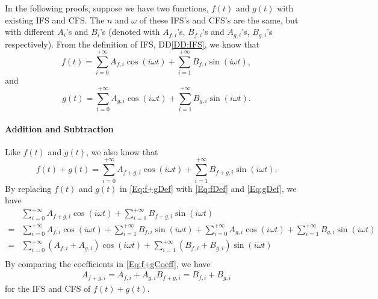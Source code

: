 \documentclass[12pt]{article}
\newcommand{\ddref}[1]{DD\ref{#1}}
\begin{document}
In the following proofs, suppose we have two functions, $f(t)$ and $g(t)$ with existing IFS and CFS. The $n$ and $\omega$ of these IFS's and CFS's are the same, but with different $A_i$'s and $B_i$'s (denoted with $A_{f, i}$'s, $B_{f, i}$'s and $A_{g,i}$'s, $B_{g,i}$'s respectively).
From the definition of IFS, \ddref{DD:IFS}, we know that \begin{equation}\label{Eq:fDef}
	f(t)=\sum_{i=0}^{+\infty}A_{f, i}\cos(i\omega t)+\sum_{i=1}^{+\infty}B_{f, i}\sin(i\omega t),
\end{equation} and \begin{equation}\label{Eq:gDef}
	g(t)=\sum_{i=0}^{+\infty}A_{g, i}\cos(i\omega t)+\sum_{i=1}^{+\infty}B_{g, i}\sin(i\omega t).
\end{equation}  
\paragraph{Addition and Subtraction}\label{App-Para:Addition&Subtraction}
Like $f(t)$ and $g(t)$, we also know that 
\begin{equation}\label{Eq:f+gDef}
	f(t)+g(t)=\sum_{i=0}^{+\infty}A_{f+g, i}\cos(i\omega t)+\sum_{i=1}^{+\infty}B_{f+g, i}\sin(i\omega t).
\end{equation} 
By replacing $f(t)$ and $g(t)$ in \autoref{Eq:f+gDef} with \autoref{Eq:fDef} and \autoref{Eq:gDef}, we have
\begin{equation}\label{Eq:f+gCoeff}
	\begin{aligned}
	&\sum_{i=0}^{+\infty}A_{f+g, i}\cos(i\omega t)+\sum_{i=1}^{+\infty}B_{f+g, i}\sin(i\omega t)\\=&\sum_{i=0}^{+\infty}A_{f, i}\cos(i\omega t)+\sum_{i=1}^{+\infty}B_{f, i}\sin(i\omega t)+\sum_{i=0}^{+\infty}A_{g, i}\cos(i\omega t)+\sum_{i=1}^{+\infty}B_{g, i}\sin(i\omega t)\\
	=&\sum_{i=0}^{+\infty}(A_{f, i}+A_{g,i})\cos(i\omega t)+\sum_{i=1}^{+\infty}(B_{f, i}+B_{g, i})\sin(i\omega t)\\
	\end{aligned}
\end{equation}
By comparing the coefficients in \autoref{Eq:f+gCoeff}, we have
\begin{equation}\label{Eq:f+gConclusion}
	\begin{aligned}
	A_{f+g, i}=A_{f,i}+A_{g, i}
	B_{f+g, i}=B_{f,i}+B_{g, i}
	\end{aligned}
\end{equation}
for the IFS and CFS of $f(t)+g(t)$.
\end{document}
